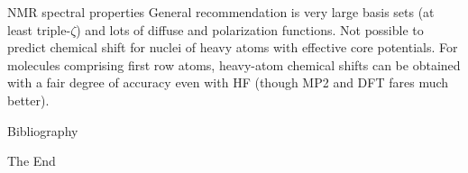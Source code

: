 \documentclass[aspectratio=169]{beamer}
\begin{document}
    \begin{frame}{NMR spectral properties}
        General recommendation is very large basis sets (at least triple-$\zeta$) and lots of diffuse and polarization functions.\newline
        \newline
        Not possible to predict chemical shift for nuclei of heavy atoms with effective core potentials.\newline
        \newline
        For molecules comprising first row atoms, heavy-atom chemical shifts can be obtained with a fair degree of accuracy even with HF (though MP2 and DFT fares much better).

    \end{frame}

    \begin{frame}[allowframebreaks]{Bibliography}
        
        
    \end{frame}



    \begin{frame}
        \Huge{\centerline{The End}}
    \end{frame}
\end{document}
